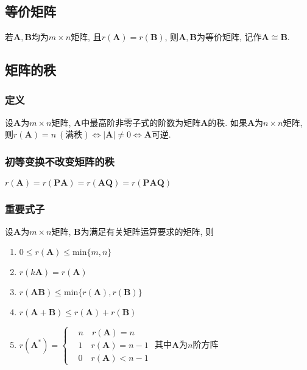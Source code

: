 \subsection{等价矩阵}
若$ \bm{A}, \bm{B} $均为$ m\times n $矩阵, 且$ r(\bm{A})=r(\bm{B}) $, 则$ \bm{A}, \bm{B} $为等价矩阵, 记作$ \bm{A}\cong\bm{B} $.
\subsection{矩阵的秩}
\subsubsection{定义}
设$ \bm{A} $为$ m\times n $矩阵, $ \bm{A} $中最高阶非零子式的阶数为矩阵$ \bm{A} $的秩.
如果$ \bm{A} $为$ n\times n $矩阵, 则$ r(\bm{A})=n\ (\text{满秩})\Leftrightarrow |\bm{A}|\neq 0\Leftrightarrow \bm{A}\text{可逆} $.
\subsubsection{初等变换不改变矩阵的秩}
$ r(\bm{A})=r(\bm{PA})=r(\bm{AQ})=r(\bm{PAQ}) $
\subsubsection{重要式子}
设$ \bm{A} $为$ m\times n $矩阵, $ \bm{B} $为满足有关矩阵运算要求的矩阵, 则
\begin{enumerate}
\item $ 0\le r(\bm{A})\le \text{min}\{m,n\} $
\item $ r(k\bm{A})=r(\bm{A}) $
\item $ r(\bm{A}\bm{B})\le \text{min}\{r(\bm{A}),r(\bm{B})\} $
\item $ r(\bm{A}+\bm{B})\le r(\bm{A})+r(\bm{B}) $
\item $ r(\bm{A}^{*})=\left\{\begin{aligned}
& n\quad r(\bm{A})=n \\
& 1\quad r(\bm{A})=n-1 \\
& 0\quad r(\bm{A})<n-1
\end{aligned}\right.$ 其中$ \bm{A} $为$ n $阶方阵
\end{enumerate}
